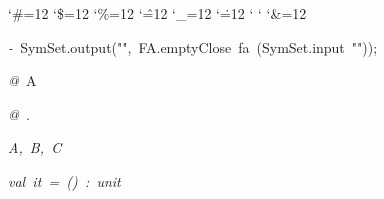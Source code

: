 \begin{list}{}
{\setlength{\leftmargin}{\leftmargini}
\setlength{\rightmargin}{0cm}
\setlength{\itemindent}{0cm}
\setlength{\listparindent}{0cm}
\setlength{\itemsep}{0cm}
\setlength{\parsep}{0cm}
\setlength{\labelsep}{0cm}
\setlength{\labelwidth}{0cm}
\catcode`\#=12
\catcode`\$=12
\catcode`\%=12
\catcode`\^=12
\catcode`\_=12
\catcode`\.=12
\catcode`
\catcode`
\catcode`\&=12
\ttfamily}
\small
\item[]\textsl{-\ }SymSet.output("",\ FA.emptyClose\ fa\ (SymSet.input\ ""));
\item[]\textsl{@\ }A
\item[]\textsl{@\ }.
\item[]\textsl{A,\ B,\ C}
\item[]\textsl{val\ it\ =\ ()\ :\ unit}
\end{list}

